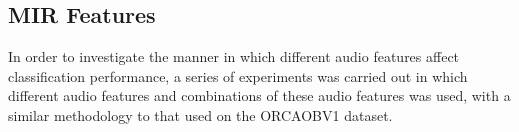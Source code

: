 %
%
\subsection{MIR Features}

In order to investigate the manner in which different audio features
affect classification performance, a series of experiments was carried
out in which different audio features and combinations of these audio
features was used, with a similar methodology to that used on the
ORCAOBV1 dataset.



